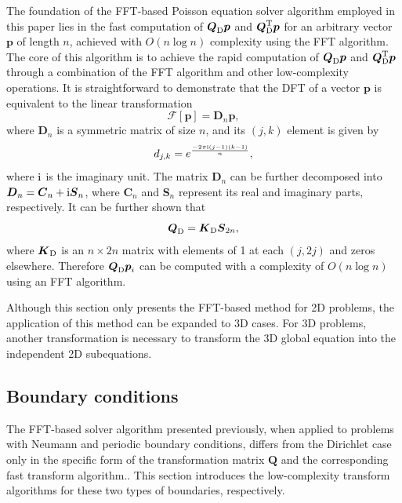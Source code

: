 \documentclass[preprint]{elsarticle}
\begin{document}
The foundation of the FFT-based Poisson equation solver algorithm employed in this paper lies in the fast computation of $\boldsymbol{Q}_{\rm D}\boldsymbol{p}$ and $\boldsymbol{Q}_{\rm D}^{\rm T}\boldsymbol{p}$ for an arbitrary vector $\boldsymbol{p}$ of length $n$, achieved with $O(n \log n)$ complexity using the FFT algorithm. The core of this algorithm is to achieve the rapid computation of $\boldsymbol{Q}_{\rm D}\boldsymbol{p}$ and $\boldsymbol{Q}_{\rm D}^{\rm T}\boldsymbol{p}$ through a combination of the FFT algorithm and other low-complexity operations. It is straightforward to demonstrate that the DFT of a vector $\boldsymbol{p}$ is equivalent to the linear transformation
\begin{equation}
    \label{eq:Fourier_trans}
    \mathcal{F}\left[\boldsymbol{p}\right]=\boldsymbol{D}_n\boldsymbol{p},
\end{equation}
where $\boldsymbol{D}_n$ is a symmetric matrix of size $n$, and its $(j,k)$ element is given by
\begin{equation}
    \label{eq:Fourier_mat_element}
    d_{j,k}=e^{\frac{-2\pi{\rm i}\left(j-1\right)\left(k-1\right)}{n}},
\end{equation}
where ${\rm i}$ is the imaginary unit. The matrix $\boldsymbol{D}_n$ can be further decomposed into $\boldsymbol{D}_n=\boldsymbol{C}_n+{\rm i}\boldsymbol{S}_n$, where $\boldsymbol{C}_n$ and $\boldsymbol{S}_n$ represent its real and imaginary parts, respectively. It can be further shown that
\begin{equation}
    \label{eq:Dirichlet_mat_decomp}
    \boldsymbol{Q}_{\rm D}=\boldsymbol{K}_{\rm D}\boldsymbol{S}_{2n},
\end{equation}
where $\boldsymbol{K}_{\rm D}$ is an $n\times2n$ matrix with elements of 1 at each $(j, 2j)$ and zeros elsewhere. Therefore $\boldsymbol{Q}_{\rm D}\boldsymbol{p}_i$ can be computed with a complexity of $O(n \log n)$ using an FFT algorithm.\par

Although this section only presents the FFT-based method for 2D problems, the application of this method can be expanded to 3D cases. For 3D problems, another transformation is necessary to transform the 3D global equation into the independent 2D subequations.

\subsection{Boundary conditions}
\label{ssec:Bound}
The FFT-based solver algorithm presented previously, when applied to problems with Neumann and periodic boundary conditions, differs from the Dirichlet case only in the specific form of the transformation matrix $\boldsymbol{Q}$ and the corresponding fast transform algorithm.. This section introduces the low-complexity transform algorithms for these two types of boundaries, respectively.
\end{document}
